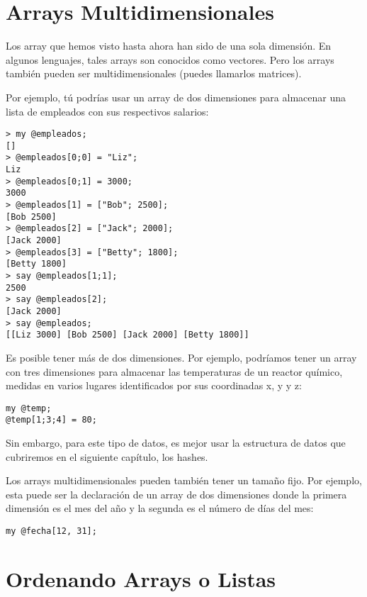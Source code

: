 \section{Arrays Multidimensionales}
\label{multidimensional_array}

Los array que hemos visto hasta ahora han sido 
de una sola dimensión. En algunos lenguajes, tales arrays
son conocidos como vectores. Pero los arrays también 
pueden ser multidimensionales (puedes llamarlos matrices).

Por ejemplo, tú podrías usar un array de dos dimensiones 
para almacenar una lista de empleados con sus respectivos
salarios:

\begin{lstlisting}
> my @empleados;
[]
> @empleados[0;0] = "Liz";
Liz
> @empleados[0;1] = 3000;
3000
> @empleados[1] = ["Bob"; 2500];
[Bob 2500]
> @empleados[2] = ["Jack"; 2000];
[Jack 2000]
> @empleados[3] = ["Betty"; 1800];
[Betty 1800]
> say @empleados[1;1];
2500
> say @empleados[2];
[Jack 2000]
> say @empleados;
[[Liz 3000] [Bob 2500] [Jack 2000] [Betty 1800]]
\end{lstlisting}

Es posible tener más de dos dimensiones. Por ejemplo, 
podríamos tener un array con tres dimensiones para almacenar
las temperaturas de un reactor químico, medidas en varios lugares
identificados por sus coordinadas x, y y z:

\begin{lstlisting}
my @temp;
@temp[1;3;4] = 80;
\end{lstlisting}

Sin embargo, para este tipo de datos, es mejor usar la estructura
de datos que cubriremos en el siguiente capítulo, los hashes.

Los arrays multidimensionales pueden también tener un tamaño fijo.
Por ejemplo, esta puede ser la declaración de un array de dos dimensiones
donde la primera dimensión es el mes del año y la segunda es el 
número de días del mes:

\begin{lstlisting}
my @fecha[12, 31];
\end{lstlisting}


\section{Ordenando Arrays o Listas}
\label{sorting}

